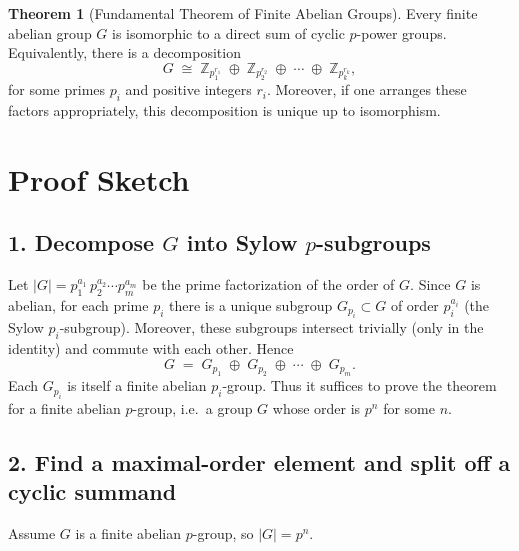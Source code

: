 \documentclass[12pt]{article}
\title{}
\author{Jerich Lee}
\date{\today}
\theoremstyle{definition} %
\newtheorem{theorem}{Theorem}
\theoremstyle{plain} %
\begin{document}
\maketitle
\begin{theorem}[Fundamental Theorem of Finite Abelian Groups]
    Every finite abelian group $G$ is isomorphic to a direct sum of cyclic $p$-power groups.  
    Equivalently, there is a decomposition
    \[
    G \;\cong\; \mathbb{Z}_{p_1^{r_1}} \;\oplus\; \mathbb{Z}_{p_2^{r_2}} 
    \;\oplus\;\cdots\;\oplus\; \mathbb{Z}_{p_k^{r_k}},
    \]
    for some primes $p_i$ and positive integers $r_i$.  Moreover, if one arranges these factors appropriately, this decomposition is unique up to isomorphism.
    \end{theorem}
    
    \section*{Proof Sketch}
    
    \subsection*{1. Decompose $G$ into Sylow $p$-subgroups}
    
    Let $|G| = p_1^{a_1}\,p_2^{a_2}\cdots p_m^{a_m}$ be the prime factorization of the order of $G$.  
    Since $G$ is abelian, for each prime $p_i$ there is a unique subgroup $G_{p_i} \subset G$ of order $p_i^{a_i}$ (the Sylow $p_i$-subgroup).  
    Moreover, these subgroups intersect trivially (only in the identity) and commute with each other.  
    Hence
    \[
      G \;=\; G_{p_1} \;\oplus\; G_{p_2} \;\oplus\;\cdots\;\oplus\; G_{p_m}.
    \]
    Each $G_{p_i}$ is itself a finite abelian $p_i$-group.  
    Thus it suffices to prove the theorem for a finite abelian $p$-group, i.e.\ a group $G$ whose order is $p^n$ for some $n$.
    
    \subsection*{2. Find a maximal-order element and split off a cyclic summand}
    
    Assume $G$ is a finite abelian $p$-group, so $|G| = p^n$.  
    
\end{document}
